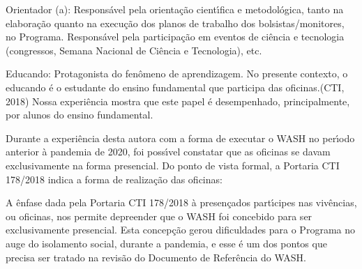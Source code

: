 \documentclass[
12pt,		%
openright,	%
twoside,  %
a4paper,			%
chapter=TITLE,		%
english,			%
french,				%
spanish,			%
brazil				%
]{USPSC-classe/USPSC}
\begin{document}
\begin{alineas}
\item Orientador (a): \textquotedbl Respons\'avel pela orienta\c{c}\~ao cient\'{\i}fica e metodol\'ogica, tanto na elabora\c{c}\~ao quanto na execu\c{c}\~ao dos planos de trabalho dos bolsistas/monitores, no Programa. Respons\'avel pela participa\c{c}\~ao em eventos de ci\^encia e tecnologia (congressos, Semana Nacional de Ci\^encia e Tecnologia), etc.\textquotedbl 
\item Educando: \textquotedbl Protagonista do fen\^omeno de aprendizagem. No presente contexto, o educando \'e o estudante do ensino fundamental que participa das oficinas.\textquotedbl  (CTI, 2018) Nossa experi\^encia mostra que este papel \'e desempenhado, principalmente, por alunos do ensino fundamental.
\end{alineas}

Durante a experi\^encia desta autora com a forma de executar o WASH no per\'{\i}odo anterior \`a pandemia de 2020, foi poss\'{\i}vel constatar que as oficinas se davam exclusivamente na forma presencial. Do ponto de vista formal, a Portaria CTI 178/2018 indica  a forma de realiza\c{c}\~ao das oficinas:


















\noindent\begin{center}\mbox{\centering{}}\end{center}


A \^enfase dada pela Portaria CTI 178/2018 \`a \textquotedbl presen\c{c}a\textquotedbl  dos part\'{\i}cipes nas \textquotedbl viv\^encias\textquotedbl , ou oficinas, nos permite depreender que o WASH foi concebido para ser exclusivamente presencial. Esta concep\c{c}\~ao gerou dificuldades para o Programa no auge do isolamento social, durante a pandemia, e esse \'e um dos pontos que precisa ser tratado na revis\~ao do Documento de Refer\^encia do WASH.
\end{document}
